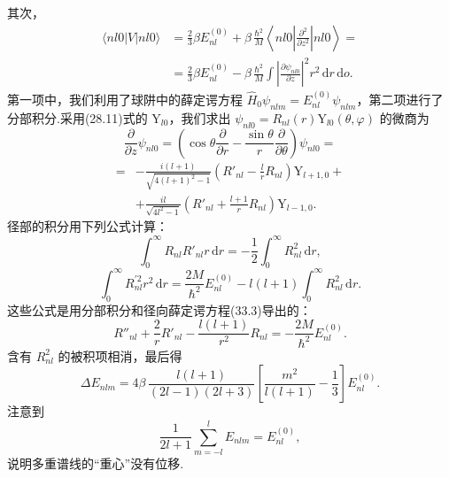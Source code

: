 \begin{xiti}
其次，
\begin{equation*}
\begin{aligned}
  \langle nl0|V|nl0\rangle&=\frac{2}{3}\beta E_{nl}^{(0)}
  +\beta\,\frac{\hbar^2}{M}\left\langle nl0\left|\frac{\partial^2}{\partial z^2}\right|nl0\right\rangle=\\
  &=\frac{2}{3}\beta E_{nl}^{(0)}-\beta\,\frac{\hbar^2}{M}
  \int\left|\frac{\partial\psi_{nl0}}{\partial z}\right|^2r^2\,\mathrm{d}r\,\mathrm{d}o.
\end{aligned}
\end{equation*}
第一项中，我们利用了球阱中的薛定谔方程 $\hat{H}_0\psi_{nlm}=E_{nl}^{(0)}\psi_{nlm}$，第二项进行了分部积分.采用(28.11)式的 $\mathrm{Y}_{l0}$，我们求出 $\psi_{nl0}=R_{nl}(r)\mathrm{Y}_{l0}(\theta,\varphi)$ 的微商为
\begin{equation*}
  \frac{\partial}{\partial z}\psi_{nl0}
  =\left(\cos\theta\frac{\partial}{\partial r}
  -\frac{\sin\theta}{r}\frac{\partial}{\partial\theta}\right)\psi_{nl0}=
\end{equation*}
\begin{equation*}
\begin{aligned}
  ={}&-\frac{i(l+1)}{\sqrt{4(l+1)^2-1}}\left(R'_{nl}-\frac{l}{r}R_{nl}\right)\mathrm{Y}_{l+1,0}+\\
  &+\frac{il}{\sqrt{4l^2-1}}\left(R'_{nl}+\frac{l+1}{r}R_{nl}\right)\mathrm{Y}_{l-1,0}.
\end{aligned}
\end{equation*}
径部的积分用下列公式计算：
\begin{equation*}
  \int_0^{\infty}R_{nl}R'_{nl}r\,\mathrm{d}r=-\frac{1}{2}\int_0^{\infty}R_{nl}^2\,\mathrm{d}r,
\end{equation*}
\begin{equation*}
  \int_0^{\infty}R_{nl}^{\prime 2}r^2\,\mathrm{d}r=\frac{2M}{\hbar^2}E_{nl}^{(0)}
  -l(l+1)\int_0^{\infty}R_{nl}^2\,\mathrm{d}r.
\end{equation*}
这些公式是用分部积分和径向薛定谔方程(33.3)导出的：
\begin{equation*}
  R''_{nl}+\frac{2}{r}R'_{nl}-\frac{l(l+1)}{r^2}R_{nl}=-\frac{2M}{\hbar^2}E_{nl}^{(0)}.
\end{equation*}
含有 $R_{nl}^2$ 的被积项相消，最后得
\begin{equation*}
  \Delta E_{nlm}=4\beta\,\frac{l(l+1)}{(2l-1)(2l+3)}
  \left[\frac{m^2}{l(l+1)}-\frac{1}{3}\right]E_{nl}^{(0)}.
\end{equation*}
注意到
\begin{equation*}
  \frac{1}{2l+1}\sum_{m=-l}^{l}E_{nlm}=E_{nl}^{(0)},
\end{equation*}
说明多重谱线的“重心”没有位移.

\end{xiti}

